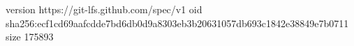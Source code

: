 version https://git-lfs.github.com/spec/v1
oid sha256:ecf1cd69aafcdde7bd6db0d9a8303eb3b20631057db693c1842e38849e7b0711
size 175893
